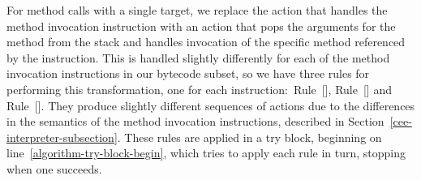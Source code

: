 For method calls with a single target, we replace the action that
handles the method invocation instruction with an action that pops the
arguments for the method from the stack and handles invocation of the
specific method referenced by the instruction.
This is handled slightly differently for each of the method invocation
instructions in our bytecode subset, so we have three rules for
performing this transformation, one for each
instruction:~Rule~[],
Rule~[] and
Rule~[].
They produce slightly different sequences of actions due to the
differences in the semantics of the method invocation instructions,
described in Section~\ref{cee-interpreter-subsection}.
These rules are applied in a try block, beginning on
line~\ref{algorithm-try-block-begin}, which tries to apply each rule in
turn, stopping when one succeeds.

